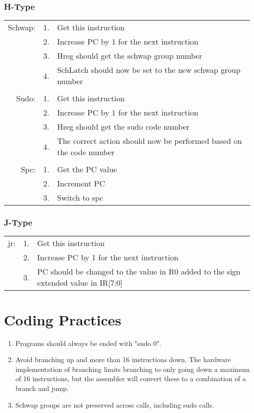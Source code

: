 		\subsubsection{H-Type}
			\begin{tabular}{ r  r  p{12cm} }
				Schwap: & 1. & Get this instruction\\
				        & 2. & Increase PC by 1 for the next instruction\\
				        & 3. & Hreg should get the schwap group number\\
				        & 4. & SchLatch should now be set to the new schwap group number\\
				        &    & \\
				Sudo:   & 1. & Get this instruction\\
				        & 2. & Increase PC by 1 for the next instruction\\
				        & 3. & Hreg should get the sudo code number\\
				        & 4. & The correct action should now be performed based on the code number\\
				        &    & \\
				Spc:    & 1. & Get the PC value\\
				        & 2. & Increment PC\\
				        & 3. & Switch to spc\\
			\end{tabular}
		\subsubsection{J-Type}
			\begin{tabular}{ r  r  p{12cm} }
				jr: & 1. & Get this instruction\\
				    & 2. & Increase PC by 1 for the next instruction\\
				    & 3. & PC should be changed to the value in R0 added to the sign extended value in IR[7:0]\\
			\end{tabular}
\section{Coding Practices}
	\begin{enumerate}
		\item Programs should always be ended with "sudo 0".
		\item Avoid branching up and more than 16 instructions down.  The hardware implementation of branching limits branching to only going down a maximum of 16 instructions, but the assembler will convert these to a combination of a branch and jump.
		\item Schwap groups are not preserved across calls, including sudo calls.
	\end{enumerate}
